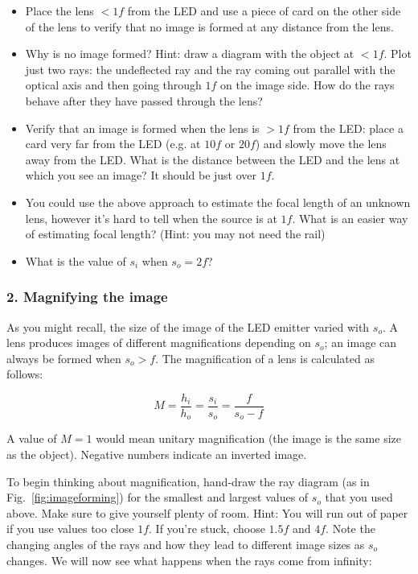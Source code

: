 \documentclass[a4paper]{report}
\begin{document}
	\begin{itemize}
		\item Place the lens $<1f$ from the LED and use a piece of card on the other side of the lens to verify that no image is formed at any distance from the lens.
		\item Why is no image formed? 
		Hint: draw a diagram with the object at $<1f$. Plot just two rays: the undeflected ray and the ray coming out parallel with the optical axis and then going through $1f$ on the image side. 
		How do the rays behave after they have passed through the lens?
		
		\item Verify that an image is formed when the lens is $>1f$ from the LED: place a card very far from the LED (e.g. at $10f$ or $20f$) and slowly move the lens away from the LED. 
		What is the distance between the LED and the lens at which you see an image? 
		It should be just over $1f$.
		
		\item You could use the above approach to estimate the focal length of an unknown lens, however it's hard to tell when the source is at $1f$. 
		What is an easier way of estimating focal length? (Hint: you may not need the rail)
		
		\item What is the value of $s_i$ when $s_o=2f$?
	\end{itemize}
	
	
	
	\clearpage
	
	\subsubsection{2. Magnifying the image}
	As you might recall, the size of the image of the LED emitter varied with $s_o$.
	A lens produces images of different magnifications depending on $s_o$; an image can always be formed when $s_o>f$. 
	The magnification of a lens is calculated as follows:
	
	\begin{equation}
	M = \frac{h_i}{h_o} = \frac{s_i}{s_o} = \frac{f}{s_o-f}
	\label{eq:mag}
	\end{equation}
	
	A value of $M=1$ would mean unitary magnification (the image is the same size as the object). 
	Negative numbers indicate an inverted image.
	
	To begin thinking about magnification, hand-draw the ray diagram (as in Fig.~\ref{fig:imageforming}) for the smallest and largest values of $s_o$ that you used above. 
	Make sure to give yourself plenty of room. 
	Hint: You will run out of paper if you use values too close $1f$.
	If you're stuck, choose $1.5f$ and $4f$.
	Note the changing angles of the rays and how they lead to different image sizes as $s_o$ changes. 
	We will now see what happens when the rays come from infinity:
	
\end{document}
